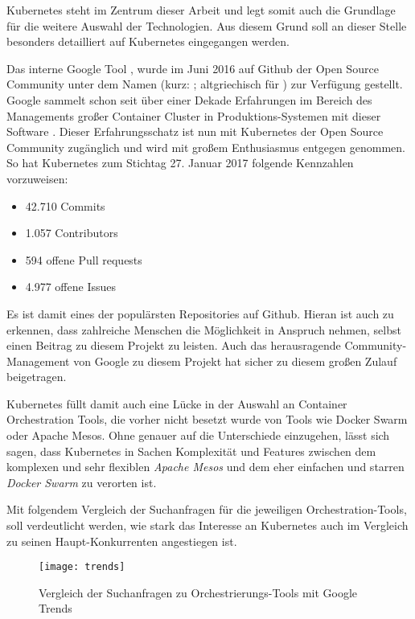 Kubernetes steht im Zentrum dieser Arbeit und legt somit auch die Grundlage
für die weitere Auswahl der Technologien. Aus diesem Grund soll an dieser Stelle
besonders detailliert auf Kubernetes eingegangen werden.

Das interne Google Tool , wurde im Juni 2016 auf Github der
Open Source Community unter dem Namen 
(kurz: ; altgriechisch für ) zur Verfügung gestellt.
Google sammelt schon seit über einer Dekade Erfahrungen im Bereich des Managements
großer Container Cluster in Produktions-Systemen mit dieser Software \cite{borg}.
Dieser
Erfahrungsschatz ist nun mit Kubernetes der Open Source Community zugänglich
und wird mit großem
Enthusiasmus entgegen genommen.
So hat Kubernetes zum Stichtag 27. Januar 2017 folgende Kennzahlen \cite{k8srepo} vorzuweisen:
\begin{itemize}
  \item 42.710 Commits
  \item 1.057 Contributors
  \item 594 offene Pull requests
  \item 4.977 offene Issues
\end{itemize}
Es ist damit eines der populärsten Repositories auf Github.
Hieran ist auch zu erkennen, dass zahlreiche
Menschen die Möglichkeit in Anspruch nehmen, selbst einen Beitrag zu diesem
Projekt zu leisten.
Auch das herausragende Community-Management von Google zu diesem Projekt
hat sicher zu diesem
großen Zulauf beigetragen.

Kubernetes füllt damit auch eine Lücke in der Auswahl an Container Orchestration
Tools, die vorher nicht besetzt wurde von Tools wie Docker Swarm oder Apache Mesos.
Ohne genauer auf die Unterschiede einzugehen, lässt sich sagen, dass Kubernetes
in Sachen Komplexität und Features zwischen dem komplexen und sehr flexiblen
\emph{Apache Mesos} und dem eher einfachen und starren \emph{Docker Swarm} zu verorten ist.

Mit folgendem Vergleich der Suchanfragen für die jeweiligen Orchestration-Tools,
soll verdeutlicht werden, wie stark das Interesse an Kubernetes auch im Vergleich
zu seinen Haupt-Konkurrenten angestiegen ist.

\begin{figure}[H]
\centering
\texttt{[image: trends]}
\caption{Vergleich der Suchanfragen zu Orchestrierungs-Tools mit Google Trends \cite{trends}}
\end{figure}


